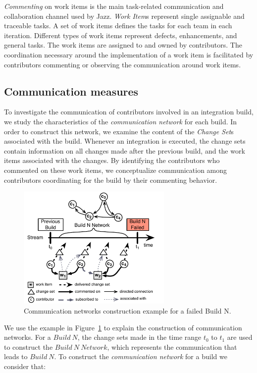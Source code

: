 \documentclass[12pt,oneside]{book}
\newcommand{\et}[1]{\emph{#1}}
\begin{document}
\et{Commenting} on work items is the main task-related communication and
collaboration channel used by Jazz. \et{Work Item}s represent single assignable
and traceable tasks. A set of work items defines the tasks for each team in each
iteration. Different types of work items represent defects, enhancements, and
general tasks. The work items are assigned to and owned by contributors. The
coordination necessary around the implementation of a work item is facilitated by
contributors commenting or observing the communication around work items.

\subsection{Communication measures}
To investigate the communication of contributors involved in an integration
build, we study the characteristics of the \emph{communication network} for each
build. In order to construct this network, we examine the content of the
\et{Change Set}s associated with the build. Whenever an integration is executed,
the change sets contain information on all changes made after the previous build,
and the work items associated with the changes. By identifying the contributors
who commented on these work items, we conceptualize communication among
contributors coordinating for the build by their commenting behavior.


\begin{figure}[t]
\begin{center}
\includegraphics[width=7.5cm]{figures/BuildResultNetworks3}
\caption{Communication networks construction example for a failed Build N.}
\label{fig:NetworkConstructionExample}
\end{center}
\end{figure}

We use the example in Figure~\ref{fig:NetworkConstructionExample} to explain the
construction of communication networks. For a $Build~N$, the change sets made in
the time range $t_0$ to $t_1$ are used to construct the $Build~N~Network$, which
represents the communication that leads to $Build~N$. To construct the
\emph{communication network} for a build we consider that:
\end{document}
